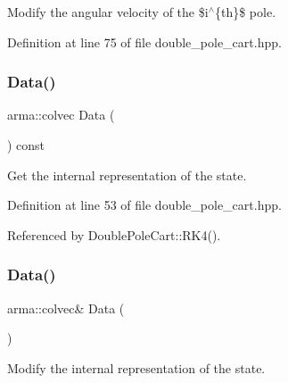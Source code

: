 Modify the angular velocity of the \$i$^\wedge$\{th\}\$ pole. 



Definition at line 75 of file double\+\_\+pole\+\_\+cart.\+hpp.

\mbox{\label{classmlpack_1_1rl_1_1DoublePoleCart_1_1State_a3824537c629944975541602c7119a3d9}} 
\subsubsection{Data()\hspace{0.1cm}{\footnotesize\ttfamily [1/2]}}
{\footnotesize\ttfamily arma\+::colvec Data (\begin{DoxyParamCaption}{ }\end{DoxyParamCaption}) const\hspace{0.3cm}{\ttfamily [inline]}}



Get the internal representation of the state. 



Definition at line 53 of file double\+\_\+pole\+\_\+cart.\+hpp.



Referenced by Double\+Pole\+Cart\+::\+R\+K4().

\mbox{\label{classmlpack_1_1rl_1_1DoublePoleCart_1_1State_ad6a50c7b5fced2e931d9a4b4ff989ed6}} 
\subsubsection{Data()\hspace{0.1cm}{\footnotesize\ttfamily [2/2]}}
{\footnotesize\ttfamily arma\+::colvec\& Data (\begin{DoxyParamCaption}{ }\end{DoxyParamCaption})\hspace{0.3cm}{\ttfamily [inline]}}



Modify the internal representation of the state. 



